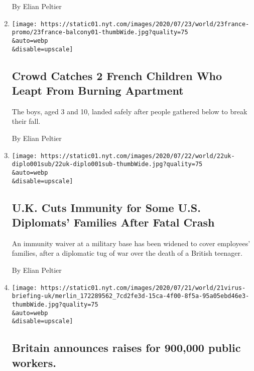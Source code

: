 \begin{enumerate}
  By Elian Peltier
\item
  \href{/2020/07/23/world/europe/france-children-rescue-video.html}{}

  \texttt{[image: https://static01.nyt.com/images/2020/07/23/world/23france-promo/23france-balcony01-thumbWide.jpg?quality=75\\\&auto=webp\\\&disable=upscale]}

  \hypertarget{crowd-catches-2-french-children-who-leapt-from-burning-apartment}{%
  \subsection{Crowd Catches 2 French Children Who Leapt From Burning
  Apartment}\label{crowd-catches-2-french-children-who-leapt-from-burning-apartment}}

  The boys, aged 3 and 10, landed safely after people gathered below to
  break their fall.

  By Elian Peltier
\item
  \href{/2020/07/22/world/europe/diplomatic-immunity-harry-dunn.html}{}

  \texttt{[image: https://static01.nyt.com/images/2020/07/22/world/22uk-diplo001sub/22uk-diplo001sub-thumbWide.jpg?quality=75\\\&auto=webp\\\&disable=upscale]}

  \hypertarget{uk-cuts-immunity-for-some-us-diplomats-families-after-fatal-crash}{%
  \subsection{U.K. Cuts Immunity for Some U.S. Diplomats' Families After
  Fatal
  Crash}\label{uk-cuts-immunity-for-some-us-diplomats-families-after-fatal-crash}}

  An immunity waiver at a military base has been widened to cover
  employees' families, after a diplomatic tug of war over the death of a
  British teenager.

  By Elian Peltier
\item
  \href{/2020/07/21/business/britain-announces-raises-for-900000-public-workers.html}{}

  \texttt{[image: https://static01.nyt.com/images/2020/07/21/world/21virus-briefing-uk/merlin\_172289562\_7cd2fe3d-15ca-4f00-8f5a-95a05ebd46e3-thumbWide.jpg?quality=75\\\&auto=webp\\\&disable=upscale]}

  \hypertarget{britain-announces-raises-for-900000-public-workers}{%
  \subsection{Britain announces raises for 900,000 public
  workers.}\label{britain-announces-raises-for-900000-public-workers}}


\end{enumerate}

